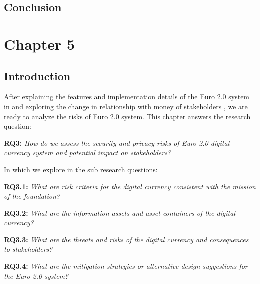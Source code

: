 \documentclass[12pt]{article} %
\newcommand{\hypernameref}[1]{\hyperref[#1]{\nameref{#1}}}
\begin{document}
{\subsection{Conclusion} \label{ssec:4.6}

\pagebreak

\section{Chapter 5} \label{sec:5}

\subsection{Introduction} \label{ssec:5:intro}

After explaining the features and implementation details of the Euro 2.0 system in \hypernameref{sec:3} and exploring the change in relationship with money of stakeholders \hypernameref{sec:4}, we are ready to analyze the risks of Euro 2.0 system. This chapter answers the research question:

\begin{quoting}
	\textbf{RQ3:} \textit{How do we assess the security and privacy risks of Euro 2.0 digital currency system and potential impact on stakeholders?}
\end{quoting}

In which we explore in the sub research questions:
\begin{quoting}
	\textbf{RQ3.1: }\textit{What are risk criteria for the digital currency consistent with the mission of the foundation?}
\end{quoting}
\begin{quoting}
	\textbf{RQ3.2: }\textit{What are the information assets and asset containers of the digital currency?}
\end{quoting}
\begin{quoting}
	\textbf{RQ3.3: }\textit{What are the threats and risks of the digital currency and consequences to stakeholders?}
\end{quoting}
\begin{quoting}
	\textbf{RQ3.4: }\textit{What are the mitigation strategies or alternative design suggestions for the Euro 2.0 system?}
\end{quoting}

}
\end{document}
